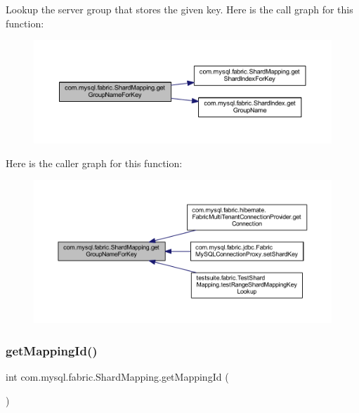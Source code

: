 Lookup the server group that stores the given key. Here is the call graph for this function\+:\nopagebreak
\begin{figure}[H]
\begin{center}
\leavevmode
\includegraphics[width=350pt]{classcom_1_1mysql_1_1fabric_1_1_shard_mapping_a614f8944251516b5f55e0a20e710ccba_cgraph}
\end{center}
\end{figure}
Here is the caller graph for this function\+:\nopagebreak
\begin{figure}[H]
\begin{center}
\leavevmode
\includegraphics[width=350pt]{classcom_1_1mysql_1_1fabric_1_1_shard_mapping_a614f8944251516b5f55e0a20e710ccba_icgraph}
\end{center}
\end{figure}
\mbox{\label{classcom_1_1mysql_1_1fabric_1_1_shard_mapping_aec74534cc8c237229a6da6b3ac657735}} 
\subsubsection{\texorpdfstring{get\+Mapping\+Id()}{getMappingId()}}
{\footnotesize\ttfamily int com.\+mysql.\+fabric.\+Shard\+Mapping.\+get\+Mapping\+Id (\begin{DoxyParamCaption}{ }\end{DoxyParamCaption})}

